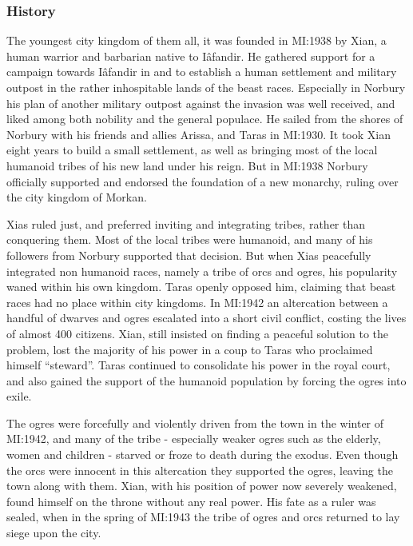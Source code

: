 \subsubsection{History}

The youngest city kingdom of them all, it was founded in MI:1938 by Xian, a
human warrior and barbarian native to Iâfandir. He gathered support for a
campaign towards Iâfandir in  and 
to establish a human settlement and military outpost in the rather
inhospitable lands of the beast races. Especially in Norbury his plan of
another military outpost against the invasion was well received, and liked
among both nobility and the general populace. He sailed from the shores of
Norbury with his friends and allies Arissa, and Taras in MI:1930. It took Xian
eight years to build a small settlement, as well as bringing most of the local
humanoid tribes of his new land under his reign. But in MI:1938 Norbury
officially supported and endorsed the foundation of a new monarchy, ruling
over the city kingdom of Morkan.

Xias ruled just, and preferred inviting and integrating tribes, rather than
conquering them. Most of the local tribes were humanoid, and many of his
followers from Norbury supported that decision. But when Xias peacefully
integrated non humanoid races, namely a tribe of orcs and ogres, his
popularity waned within his own kingdom. Taras openly opposed him, claiming
that beast races had no place within city kingdoms. In MI:1942 an
altercation between a handful of dwarves and ogres escalated into a short
civil conflict, costing the lives of almost 400 citizens. Xian, still insisted
on finding a peaceful solution to the problem, lost the majority of his power
in a coup to Taras who proclaimed himself ``steward''. Taras continued to
consolidate his power in the royal court, and also gained the support of the
humanoid population by forcing the ogres into exile.

The ogres were forcefully and violently driven from the town in the winter of
MI:1942, and many of the tribe - especially weaker ogres such as the
elderly, women and children - starved or froze to death during the exodus. Even
though the orcs were innocent in this altercation they supported the ogres,
leaving the town along with them. Xian, with his position of power now
severely weakened, found himself on the throne without any real power. His
fate as a ruler was sealed, when in the spring of MI:1943 the tribe of
ogres and orcs returned to lay siege upon the city.

